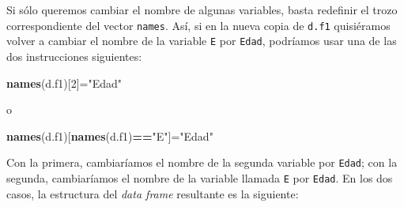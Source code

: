 \documentclass[
]{book}
\newenvironment{Shaded}{\begin{snugshade}}{\end{snugshade}}
\newcommand{\CommentTok}[1]{\textcolor[rgb]{0.56,0.35,0.01}{\textit{#1}}}
\newcommand{\DecValTok}[1]{\textcolor[rgb]{0.00,0.00,0.81}{#1}}
\newcommand{\KeywordTok}[1]{\textcolor[rgb]{0.13,0.29,0.53}{\textbf{#1}}}
\newcommand{\NormalTok}[1]{#1}
\newcommand{\OperatorTok}[1]{\textcolor[rgb]{0.81,0.36,0.00}{\textbf{#1}}}
\newcommand{\StringTok}[1]{\textcolor[rgb]{0.31,0.60,0.02}{#1}}
\theoremstyle{definition}
\theoremstyle{definition}
\theoremstyle{definition}
\theoremstyle{remark}
\begin{document}
\begin{Shaded}
\end{Shaded}

Si sólo queremos cambiar el nombre de algunas variables, basta redefinir el trozo correspondiente del vector \texttt{names}. Así, si en la nueva copia de \texttt{d.f1} quisiéramos volver a cambiar el nombre de la variable \texttt{E} por \texttt{Edad}, podríamos usar una de las dos instrucciones siguientes:

\begin{Shaded}
\begin{Highlighting}[]
\KeywordTok{names}\NormalTok{(d.f1)[}\DecValTok{2}\NormalTok{]=}\StringTok{"Edad"}
\end{Highlighting}
\end{Shaded}

o

\begin{Shaded}
\begin{Highlighting}[]
\KeywordTok{names}\NormalTok{(d.f1)[}\KeywordTok{names}\NormalTok{(d.f1)}\OperatorTok{==}\StringTok{"E"}\NormalTok{]=}\StringTok{"Edad"}
\end{Highlighting}
\end{Shaded}

Con la primera, cambiaríamos el nombre de la segunda variable por \texttt{Edad}; con la segunda, cambiaríamos el nombre de la variable llamada \texttt{E} por \texttt{Edad}. En los dos casos, la estructura del \emph{data frame} resultante es la siguiente:

\begin{Shaded}
\end{Shaded}
\end{document}
